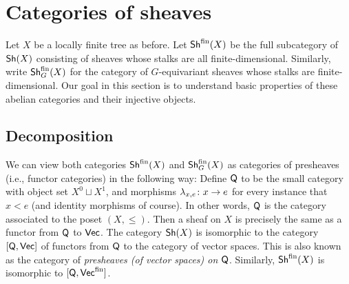 \documentclass[letter]{amsart}
\theoremstyle{definition}
\theoremstyle{remark}
\numberwithin{thm}{section}
\numberwithin{equation}{section}
\begin{document}
\section{Categories of sheaves}

Let $X$ be a locally finite tree as before.  Let ${\mathsf{Sh}}^{\operatorname{fin}}(X)$ be the full subcategory of ${\mathsf{Sh}}(X)$ consisting of sheaves whose stalks are all finite-dimensional.  Similarly, write ${\mathsf{Sh}}_G^{\operatorname{fin}}(X)$ for the category of $G$-equivariant sheaves whose stalks are finite-dimensional.  Our goal in this section is to understand basic properties of these abelian categories and their injective objects.

\subsection{Decomposition}

We can view both categories ${\mathsf{Sh}}^{\operatorname{fin}}(X)$ and ${\mathsf{Sh}}_G^{\operatorname{fin}}(X)$ as categories of presheaves (i.e., functor categories) in the following way:  Define ${\mathsf{Q}}$ to be the small category with object set $X^0 \sqcup X^1$, and morphisms $\lambda_{x,e} \colon x \rightarrow e$ for every instance that $x < e$ (and identity morphisms of course).  In other words, ${\mathsf{Q}}$ is the category associated to the poset $(X, \leq)$.  Then a sheaf on $X$ is precisely the same as a functor from ${\mathsf{Q}}$ to ${\mathsf{Vec}}$.  The category ${\mathsf{Sh}}(X)$ is isomorphic to the category $[{\mathsf{Q}},{\mathsf{Vec}}]$ of functors from ${\mathsf{Q}}$ to the category of vector spaces.  This is also known as the category of {\em presheaves (of vector spaces) on ${\mathsf{Q}}$}.  Similarly, ${\mathsf{Sh}}^{\operatorname{fin}}(X)$ is isomorphic to $[{\mathsf{Q}}, {\mathsf{Vec}}^{\operatorname{fin}}]$.     
\end{document}
